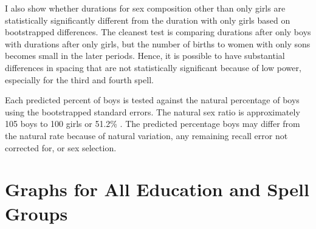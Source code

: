 \documentclass[12pt,letterpaper]{article}
\begin{document}
I also show whether durations for sex composition other than only girls are statistically 
significantly different from the duration with only girls based on bootstrapped 
differences. 
The cleanest test is comparing durations after only boys with durations after
only girls, but the number of births to women with only sons becomes small 
in the later periods.
Hence, it is possible to have substantial differences in spacing that are
not statistically significant because of low power, especially for the third 
and fourth spell.

Each predicted percent of boys is tested against the natural percentage of
boys using the bootstrapped standard errors.
The natural sex ratio is approximately 105 boys to 100 girls or
51.2\% \citep{ben-porath76b,jacobsen99,Portner2015b}.
The predicted percentage boys may differ from the natural rate because of 
natural variation, any remaining recall error not corrected for, or 
sex selection. 



















\clearpage
\newpage


\section{Graphs for All Education and Spell Groups}

\setcounter{figure}{0}
\setcounter{table}{0}


\end{document}
